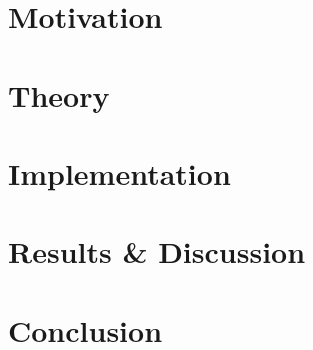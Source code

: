 \documentclass[12pt, twoside,a4paper]{report}
\begin{document}
\tableofcontents
\chapter{Motivation}


\chapter{Theory}


\chapter{Implementation}


\chapter{Results \& Discussion}


\chapter{Conclusion}



%

\end{document}
